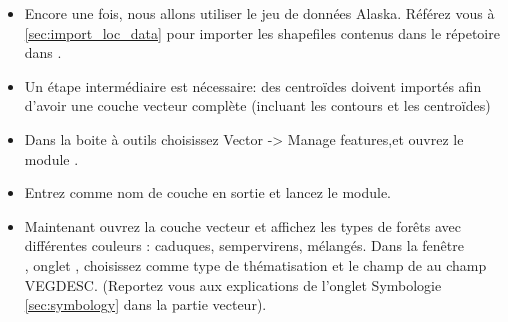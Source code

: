 \begin{itemize}[label=--]
\item Encore une fois, nous allons utiliser le jeu de  données Alaska. Référez vous à \ref{sec:import_loc_data} pour importer les shapefiles contenus dans le répetoire  dans \grass.
\item Un étape intermédiaire est nécessaire: des centroïdes doivent importés afin d'avoir une couche \grass vecteur complète (incluant les contours et les centroïdes)
\item Dans la boite à outils choisissez Vector -> Manage features,et ouvrez le module .
\item Entrez comme nom de couche en sortie  et lancez le module.
\item Maintenant ouvrez la couche vecteur  et affichez les types de forêts avec différentes couleurs : caduques, sempervirens, mélangés. Dans la fenêtre\\ , onglet  , choisissez  comme type de thématisation et le champ de  au champ VEGDESC. (Reportez vous aux explications de l'onglet Symbologie \ref{sec:symbology} dans la partie vecteur).


\end{itemize}
